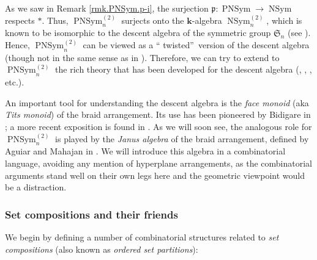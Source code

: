 \documentclass[numbers=enddot,12pt,final,onecolumn,notitlepage]{scrartcl}%
\theoremstyle{definition}
\begin{document}
As we saw in Remark \ref{rmk.PNSym.p-i}, the surjection $\mathfrak{p}%
:\operatorname*{PNSym}\rightarrow\operatorname*{NSym}$ respects $\ast$. Thus,
$\operatorname*{PNSym}\nolimits_{n}^{\left(  2\right)  }$ surjects onto the
$\mathbf{k}$-algebra $\operatorname*{NSym}\nolimits_{n}^{\left(  2\right)  }$,
which is known to be isomorphic to the descent algebra of the symmetric group
$\mathfrak{S}_{n}$ (see \cite[\S 5.1]{ncsf1}). Hence, $\operatorname*{PNSym}%
\nolimits_{n}^{\left(  2\right)  }$ can be viewed as a \textquotedblleft
twisted\textquotedblright\ version of the descent algebra (though not in the
same sense as in \cite{PatSch06}). Therefore, we can try to extend to
$\operatorname*{PNSym}\nolimits_{n}^{\left(  2\right)  }$ the rich theory that
has been developed for the descent algebra (\cite{GarReu89}, \cite{Bidiga97},
\cite{Schocker}, etc.).

An important tool for understanding the descent algebra is the \emph{face
monoid} (aka \emph{Tits monoid}) of the braid arrangement. Its use has been
pioneered by Bidigare in \cite{Bidiga97}; a more recent exposition is found in
\cite{Saliol06}. As we will soon see, the analogous role for
$\operatorname*{PNSym}\nolimits_{n}^{\left(  2\right)  }$ is played by the
\emph{Janus algebra} of the braid arrangement, defined by Aguiar and Mahajan
in \cite[\S 1.9.3]{AguMah20}. We will introduce this algebra in a
combinatorial language, avoiding any mention of hyperplane arrangements, as
the combinatorial arguments stand well on their own legs here and the
geometric viewpoint would be a distraction.

\subsubsection{Set compositions and their friends}

We begin by defining a number of combinatorial structures related to \emph{set
compositions} (also known as \emph{ordered set partitions}):
\end{document}
